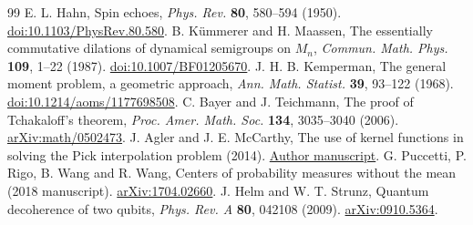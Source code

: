 \documentclass[11pt,a4paper]{article}
\begin{document}
\begin{thebibliography}{99}
 E. L. Hahn, Spin echoes,
\emph{Phys. Rev.} \textbf{80}, 580--594 (1950).
\href{https://doi.org/10.1103/PhysRev.80.580}{doi:10.1103/PhysRev.80.580}.
 B. K\"ummerer and H. Maassen,
The essentially commutative dilations of dynamical semigroups on $M_n$,
\emph{Commun. Math. Phys.} \textbf{109}, 1--22 (1987).
\href{https://doi.org/10.1007/BF01205670}{doi:10.1007/BF01205670}.
 J. H. B. Kemperman,
The general moment problem, a geometric approach,
\emph{Ann. Math. Statist.} \textbf{39}, 93--122 (1968).
\href{https://doi.org/10.1214/aoms/1177698508}{doi:10.1214/aoms/1177698508}.
 C. Bayer and J. Teichmann,
The proof of Tchakaloff's theorem,
\emph{Proc. Amer. Math. Soc.} \textbf{134}, 3035--3040 (2006).
\href{https://arxiv.org/abs/math/0502473}{arXiv:math/0502473}.
 J. Agler and J. E. McCarthy,
The use of kernel functions in solving the Pick interpolation problem
(2014). \href{https://www.math.wustl.edu/~mccarthy/public_papers/KernelsandPick.pdf}{Author manuscript}.
 G. Puccetti, P. Rigo, B. Wang and R. Wang,
Centers of probability measures without the mean (2018 manuscript).
\href{https://arxiv.org/abs/1704.02660}{arXiv:1704.02660}.
 J. Helm and W. T. Strunz,
Quantum decoherence of two qubits,
\emph{Phys. Rev. A} \textbf{80}, 042108 (2009).
\href{https://arxiv.org/abs/0910.5364}{arXiv:0910.5364}.
\end{thebibliography}
\end{document}
